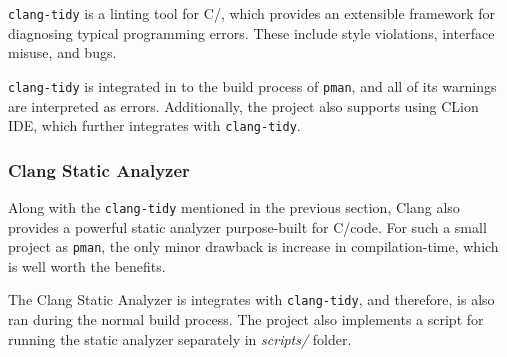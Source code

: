 \texttt{clang-tidy} is a linting tool for C/\CC, which provides an extensible
framework for diagnosing typical programming errors. These include style
violations, interface misuse, and bugs.

\texttt{clang-tidy} is integrated in to the build process of \texttt{pman},
and all of its warnings are interpreted as errors. Additionally, the project
also supports using CLion IDE, which further integrates with \texttt{clang-tidy}.

\subsubsection{Clang Static Analyzer}

Along with the \texttt{clang-tidy} mentioned in the previous section, Clang
also provides a powerful static analyzer purpose-built for C/\CC code. For such
a small project as \texttt{pman}, the only minor drawback is increase in
compilation-time, which is well worth the benefits.

The Clang Static Analyzer is integrates with \texttt{clang-tidy}, and therefore,
is also ran during the normal build process. The project also implements a
script for running the static analyzer separately in \textit{scripts/} folder.

